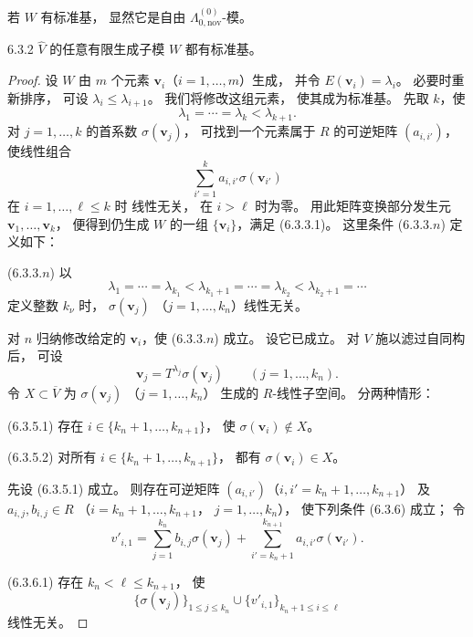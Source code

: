 若 $W$ 有标准基，
显然它是自由
$\Lambda_{0,\mathrm{nov}}^{(0)}$-模。

\begin{lemma}{6.3.2}\label{lem:6-3-2}
$\widehat V$ 的任意有限生成子模 $W$
都有标准基。
\end{lemma}

\begin{proof}
设 $W$ 由 $m$ 个元素
$\mathbf v_i$（$i=1,\ldots,m$）生成，
并令 $E(\mathbf v_i)=\lambda_i$。
必要时重新排序，
可设 $\lambda_i\le\lambda_{i+1}$。
我们将修改这组元素，
使其成为标准基。
先取 $k$，使
\[
\lambda_1=\cdots=\lambda_k
<\lambda_{k+1}.
\]
对 $j=1,\ldots,k$ 的首系数
$\sigma(\mathbf v_j)$，
可找到一个元素属于 $R$ 的可逆矩阵
$(a_{i,i'})$，使线性组合
\[
\sum_{i'=1}^{k}a_{i,i'}
\sigma(\mathbf v_{i'})
\]
在 $i=1,\ldots,\ell\le k$ 时
线性无关，
在 $i>\ell$ 时为零。
用此矩阵变换部分发生元
$\mathbf v_1,\ldots,\mathbf v_k$，
便得到仍生成 $W$ 的一组
$\{\mathbf v_i\}$，满足 (6.3.3.1)。
这里条件 (6.3.3.$n$) 定义如下：

\noindent\textup{(6.3.3.$n$)}\quad
以
\[
\lambda_1=\cdots=\lambda_{k_1}
<\lambda_{k_1+1}=\cdots=\lambda_{k_2}
<\lambda_{k_2+1}=\cdots
\]
定义整数 $k_\nu$ 时，
$\sigma(\mathbf v_j)$
（$j=1,\ldots,k_n$）线性无关。

对 $n$ 归纳修改给定的
$\mathbf v_i$，使 (6.3.3.$n$) 成立。
设它已成立。
对 $V$ 施以滤过自同构后，
可设
\begin{equation}
\mathbf v_j=T^{\lambda_j}
\sigma(\mathbf v_j)
\qquad(j=1,\ldots,k_n).
\tag{6.3.4}\label{eq:6-3-4}
\end{equation}
令 $X\subset\overline V$
为 $\sigma(\mathbf v_j)$
（$j=1,\ldots,k_n$）
生成的 $R$-线性子空间。
分两种情形：

\noindent\textup{(6.3.5.1)}\quad
存在 $i\in\{k_n+1,\ldots,k_{n+1}\}$，
使 $\sigma(\mathbf v_i)\notin X$。

\noindent\textup{(6.3.5.2)}\quad
对所有 $i\in\{k_n+1,\ldots,k_{n+1}\}$，
都有 $\sigma(\mathbf v_i)\in X$。

先设 (6.3.5.1) 成立。
则存在可逆矩阵
$(a_{i,i'})$（$i,i'=k_n+1,\ldots,k_{n+1}$）
及 $a_{i,j},b_{i,j}\in R$
（$i=k_n+1,\ldots,k_{n+1}$，
$j=1,\ldots,k_n$），
使下列条件 (6.3.6) 成立；
令
\[
v'_{i,1}
=\sum_{j=1}^{k_n}b_{i,j}\sigma(\mathbf v_j)
+\sum_{i'=k_n+1}^{k_{n+1}}
a_{i,i'}\sigma(\mathbf v_{i'}).
\]

\noindent\textup{(6.3.6.1)}\quad
存在 $k_n<\ell\le k_{n+1}$，
使
\[
\{\sigma(\mathbf v_j)\}_{1\le j\le k_n}
\cup\{v'_{i,1}\}_{k_n+1\le i\le\ell}
\]
线性无关。


\end{proof}
